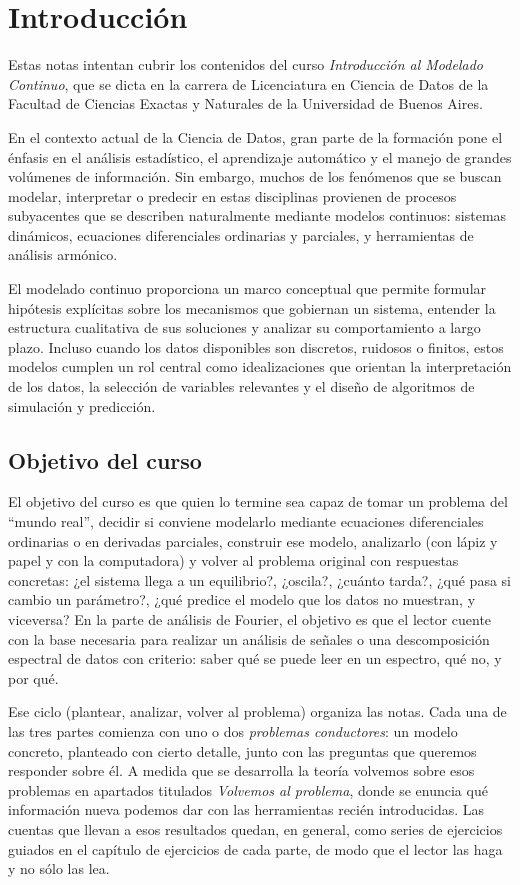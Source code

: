 \documentclass[12pt, a4paper]{amsbook}
\theoremstyle{remark}
\theoremstyle{definition}
\numberwithin{section}{chapter}
\numberwithin{subsection}{section}
\numberwithin{equation}{section}
\numberwithin{figure}{chapter}
\begin{document}
\chapter*{Introducción}


Estas notas intentan cubrir los contenidos del curso \emph{Introducción al Modelado Continuo}, que se dicta en la carrera de Licenciatura en Ciencia de Datos de la Facultad de Ciencias Exactas y Naturales de la Universidad de Buenos Aires.

En el contexto actual de la Ciencia de Datos, gran parte de la formación pone el énfasis en el análisis estadístico, el aprendizaje automático y el manejo de grandes volúmenes de información. Sin embargo, muchos de los fenómenos que se buscan modelar, interpretar o predecir en estas disciplinas provienen de procesos subyacentes que se describen naturalmente mediante modelos continuos: sistemas dinámicos, ecuaciones diferenciales ordinarias y parciales, y herramientas de análisis armónico.

El modelado continuo proporciona un marco conceptual que permite formular hipótesis explícitas sobre los mecanismos que gobiernan un sistema, entender la estructura cualitativa de sus soluciones y analizar su comportamiento a largo plazo. Incluso cuando los datos disponibles son discretos, ruidosos o finitos, estos modelos cumplen un rol central como idealizaciones que orientan la interpretación de los datos, la selección de variables relevantes y el diseño de algoritmos de simulación y predicción.

\section*{Objetivo del curso}

El objetivo del curso es que quien lo termine sea capaz de tomar un problema del ``mundo real'', decidir si conviene modelarlo mediante ecuaciones diferenciales ordinarias o en derivadas parciales, construir ese modelo, analizarlo (con lápiz y papel y con la computadora) y volver al problema original con respuestas concretas: ¿el sistema llega a un equilibrio?, ¿oscila?, ¿cuánto tarda?, ¿qué pasa si cambio un parámetro?, ¿qué predice el modelo que los datos no muestran, y viceversa? En la parte de análisis de Fourier, el objetivo es que el lector cuente con la base necesaria para realizar un análisis de señales o una descomposición espectral de datos con criterio: saber qué se puede leer en un espectro, qué no, y por qué.

Ese ciclo (plantear, analizar, volver al problema) organiza las notas. Cada una de las tres partes comienza con uno o dos \emph{problemas conductores}: un modelo concreto, planteado con cierto detalle, junto con las preguntas que queremos responder sobre él. A medida que se desarrolla la teoría volvemos sobre esos problemas en apartados titulados \emph{Volvemos al problema}, donde se enuncia qué información nueva podemos dar con las herramientas recién introducidas. Las cuentas que llevan a esos resultados quedan, en general, como series de ejercicios guiados en el capítulo de ejercicios de cada parte, de modo que el lector las haga y no sólo las lea.
\end{document}
